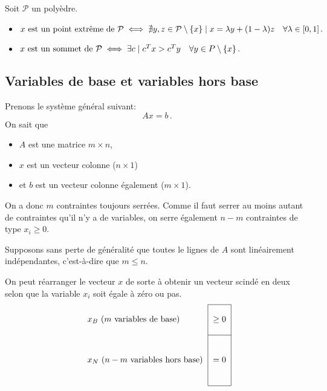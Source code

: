 	Soit $\mathcal{P}$ un polyèdre.

	\begin{itemize}
		\item $\textnormal{$x$ est un point extrême de $\mathcal{P}$}
		\iff \nexists y,z \in \mathcal{P} \setminus \{x\} \suchthat x = \lambda y + (1 - \lambda) z
		\quad \forall \lambda \in \interval{0}{1}\,.$
		\item $\textnormal{$x$ est un sommet de $\mathcal{P}$}
		\iff \exists c \suchthat c^T x > c^T y
		\quad \forall y \in P \setminus \{x\} \,.$
	\end{itemize}

\subsection{Variables de base et variables hors base}

	Prenons le système général suivant:
	\[
	Ax = b\,.
	\]
	On sait que

	\begin{itemize}
		\item $A$ est une matrice $m \times n$,
		\item $x$ est un vecteur colonne ($n \times 1$)
		\item et $b$ est un vecteur colonne également ($m \times 1$).
	\end{itemize}

	On a donc $m$ contraintes toujours serrées.
	Comme il faut serrer au moins autant de contraintes
	qu'il n'y a de variables,
	on serre également $n-m$ contraintes de type $x_i \ge 0$.

	Supposons sans perte de généralité que toutes le lignes de $A$
	sont linéairement indépendantes,
	c'est-à-dire que $m \le n$.

	On peut réarranger le vecteur $x$ de sorte à obtenir
	un vecteur scindé en deux selon que
	la variable $x_i$ soit égale à zéro ou pas.
	\[
	\begin{tabular}{l|c|}
		\cline{2-2}
		\multirow{3}{*}{$\xb$ ($m$ variables de base)} & \multirow{3}{*}{$\ge 0$}\\
		& \\
		& \\
		\cline{2-2}
		\multirow{5}{*}{$\xn$ ($n-m$ variables hors base)} & \multirow{5}{*}{$= 0$}\\
		& \\
		& \\
		& \\
		& \\
		\cline{2-2}
	\end{tabular}
	\]

